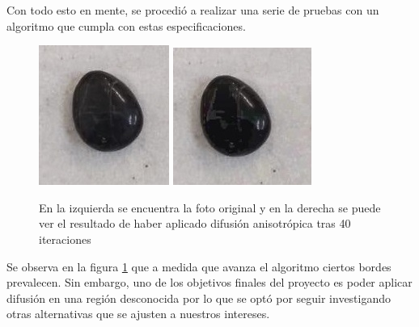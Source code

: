 \documentclass[assd_tpf_lineasinvest.tex]{subfiles}
\begin{document}
Con todo esto en mente, se procedió a realizar una serie de pruebas con un algoritmo que cumpla con estas especificaciones.
\begin{figure}[H]
\begin{centering}
\includegraphics[scale=.98]{diforig.jpeg}
\includegraphics[scale=1]{dif40it.jpeg}
\par\end{centering}
\caption{En la izquierda se encuentra la foto original y en la derecha se puede ver el resultado de haber aplicado difusión anisotrópica tras 40 iteraciones}
\label{fig:compAnisotrop}
\end{figure}
Se observa en la figura \ref{fig:compAnisotrop} que a medida que avanza el algoritmo ciertos bordes prevalecen. Sin embargo, uno de los objetivos finales del proyecto es poder aplicar difusión en una región desconocida por lo que se optó por seguir investigando otras alternativas que se ajusten a nuestros intereses.
\end{document}
